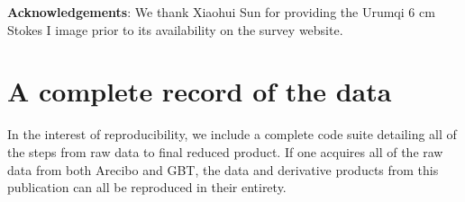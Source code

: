 % 
% 
% 
% 

\textbf{Acknowledgements}:
We thank Xiaohui Sun for providing the Urumqi 6 cm Stokes I image prior to its
availability on the survey website.

\appendix
\section{A complete record of the data}
In the interest of reproducibility, we include a complete code suite detailing
all of the steps from raw data to final reduced product.  If one acquires all
of the raw data from both Arecibo and GBT, the data and derivative products
from this publication can all be reproduced in their entirety.

